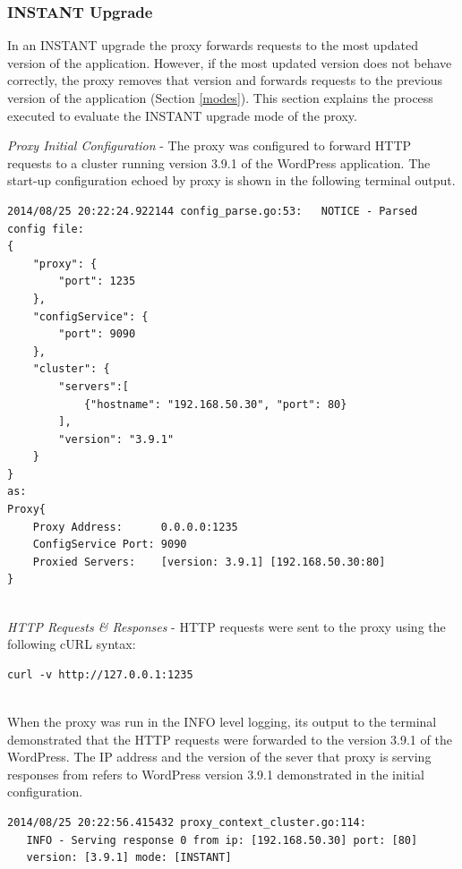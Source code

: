 \documentclass[a4paper,11pt,twoside]{report}
\begin{document}
\subsubsection*{INSTANT Upgrade}
In an INSTANT upgrade the proxy  forwards requests to the most updated version of the application. However, if the most updated version does not behave correctly, the proxy removes that version and forwards requests to the previous version of the application (Section \ref{modes}). This section explains the process executed to evaluate the INSTANT upgrade mode of the proxy.\medskip

\noindent
\textit{Proxy Initial Configuration} - The proxy was configured to forward HTTP requests to a cluster running version 3.9.1 of the WordPress application. The start-up configuration echoed by proxy is shown in the following terminal output.\smallskip

\begin{lstlisting}[language=terminal]
2014/08/25 20:22:24.922144 config_parse.go:53:   NOTICE - Parsed config file:
{
    "proxy": {
        "port": 1235
    },
    "configService": {
        "port": 9090
    },
    "cluster": {
        "servers":[
            {"hostname": "192.168.50.30", "port": 80}
        ],
        "version": "3.9.1"
    }
}
as:
Proxy{
	Proxy Address:      0.0.0.0:1235
	ConfigService Port: 9090
	Proxied Servers:    [version: 3.9.1] [192.168.50.30:80]
}   
\end{lstlisting}

\noindent \\
\textit{HTTP Requests \& Responses} - HTTP requests were sent to the proxy using the following cURL syntax:\smallskip
\begin{lstlisting}[language=terminal] 
curl -v http://127.0.0.1:1235 
\end{lstlisting} 

\noindent\\
When the proxy was run in the INFO level logging, its output to the terminal demonstrated that the HTTP requests were forwarded to the version 3.9.1 of the WordPress. The IP address and the version of the sever that proxy is serving responses from refers to WordPress version 3.9.1 demonstrated in the initial configuration.\smallskip

\begin{lstlisting}[language=terminal] 
2014/08/25 20:22:56.415432 proxy_context_cluster.go:114:     
   INFO - Serving response 0 from ip: [192.168.50.30] port: [80] 
   version: [3.9.1] mode: [INSTANT]
\end{lstlisting} 
\end{document}
